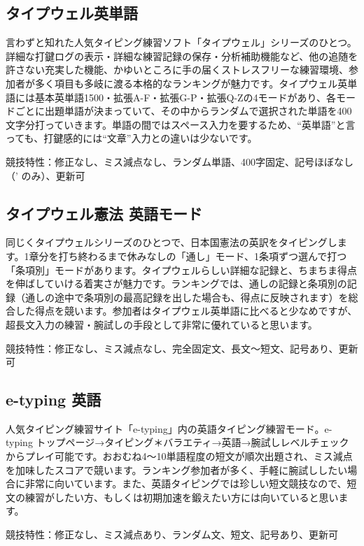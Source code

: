 \subsection{タイプウェル英単語}

言わずと知れた人気タイピング練習ソフト「タイプウェル」シリーズのひとつ。詳細な打鍵ログの表示・詳細な練習記録の保存・分析補助機能など、他の追随を許さない充実した機能、かゆいところに手の届くストレスフリーな練習環境、参加者が多く項目も多岐に渡る本格的なランキングが魅力です。タイプウェル英単語には基本英単語1500・拡張A-F・拡張G-P・拡張Q-Zの4モードがあり、各モードごとに出題単語が決まっていて、その中からランダムで選択された単語を400文字分打っていきます。単語の間ではスペース入力を要するため、“英単語”と言っても、打鍵感的には“文章”入力との違いは少ないです。

競技特性：修正なし、ミス減点なし、ランダム単語、400字固定、記号ほぼなし（' のみ）、更新可

\subsection{タイプウェル憲法 英語モード}

同じくタイプウェルシリーズのひとつで、日本国憲法の英訳をタイピングします。1章分を打ち終わるまで休みなしの「通し」モード、1条項ずつ選んで打つ「条項別」モードがあります。タイプウェルらしい詳細な記録と、ちまちま得点を伸ばしていける着実さが魅力です。ランキングでは、通しの記録と条項別の記録（通しの途中で条項別の最高記録を出した場合も、得点に反映されます）を総合した得点を競います。参加者はタイプウェル英単語に比べると少なめですが、超長文入力の練習・腕試しの手段として非常に優れていると思います。

競技特性：修正なし、ミス減点なし、完全固定文、長文～短文、記号あり、更新可

\subsection{e-typing 英語}

人気タイピング練習サイト「e-typing」内の英語タイピング練習モード。e-typing トップページ→タイピング＊バラエティ→英語→腕試しレベルチェック からプレイ可能です。おおむね4～10単語程度の短文が順次出題され、ミス減点を加味したスコアで競います。ランキング参加者が多く、手軽に腕試ししたい場合に非常に向いています。また、英語タイピングでは珍しい短文競技なので、短文の練習がしたい方、もしくは初期加速を鍛えたい方には向いていると思います。

競技特性：修正なし、ミス減点あり、ランダム文、短文、記号あり、更新可

